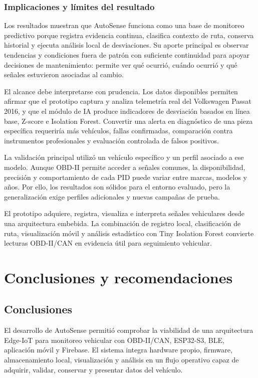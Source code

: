 \documentclass[12pt,letterpaper]{report}
\begin{document}
\subsection{Implicaciones y límites del resultado}

Los resultados muestran que AutoSense funciona como una base de monitoreo predictivo porque registra evidencia continua, clasifica contexto de ruta, conserva historial y ejecuta análisis local de desviaciones. Su aporte principal es observar tendencias y condiciones fuera de patrón con suficiente continuidad para apoyar decisiones de mantenimiento: permite ver qué ocurrió, cuándo ocurrió y qué señales estuvieron asociadas al cambio.

El alcance debe interpretarse con prudencia. Los datos disponibles permiten afirmar que el prototipo captura y analiza telemetría real del Volkswagen Passat 2016, y que el módulo de IA produce indicadores de desviación basados en línea base, Z-score e Isolation Forest. Convertir una alerta en diagnóstico de una pieza específica requeriría más vehículos, fallas confirmadas, comparación contra instrumentos profesionales y evaluación controlada de falsos positivos.

La validación principal utilizó un vehículo específico y un perfil asociado a ese modelo. Aunque OBD-II permite acceder a señales comunes, la disponibilidad, precisión y comportamiento de cada PID puede variar entre marcas, modelos y años. Por ello, los resultados son sólidos para el entorno evaluado, pero la generalización exige perfiles adicionales y nuevas campañas de prueba.

El prototipo adquiere, registra, visualiza e interpreta señales vehiculares desde una arquitectura embebida. La combinación de registro local, clasificación de ruta, visualización móvil y análisis estadístico con Tiny Isolation Forest convierte lecturas OBD-II/CAN en evidencia útil para seguimiento vehicular.

\chapter{Conclusiones y recomendaciones}

\section{Conclusiones}

El desarrollo de AutoSense permitió comprobar la viabilidad de una arquitectura Edge-IoT para monitoreo vehicular con OBD-II/CAN, ESP32-S3, BLE, aplicación móvil y Firebase. El sistema integra hardware propio, firmware, almacenamiento local, visualización y análisis en un flujo operativo capaz de adquirir, validar, conservar y presentar datos del vehículo.
\end{document}
